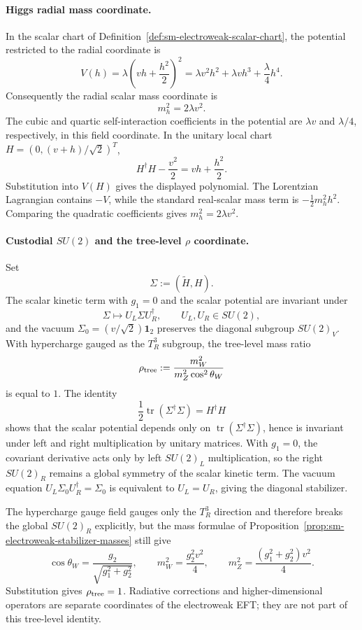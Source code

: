 \paragraph{Higgs radial mass coordinate.}
In the scalar chart of Definition~\ref{def:sm-electroweak-scalar-chart}, the
potential restricted to the radial coordinate is
\[
  V(h)=\lambda\left(vh+\frac{h^2}{2}\right)^2
  =
  \lambda v^2h^2+\lambda vh^3+\frac{\lambda}{4}h^4 .
\]
Consequently the radial scalar mass coordinate is
\[
  m_h^2=2\lambda v^2 .
\]
The cubic and quartic self-interaction coefficients in the potential are
\(\lambda v\) and \(\lambda/4\), respectively, in this field coordinate.
In the unitary local chart \(H=(0,(v+h)/\sqrt2)^T\),
\[
  H^\dagger H-\frac{v^2}{2}=vh+\frac{h^2}{2}.
\]
Substitution into \(V(H)\) gives the displayed polynomial.  The Lorentzian
Lagrangian contains \(-V\), while the standard real-scalar mass term is
\(-\frac12m_h^2h^2\).  Comparing the quadratic coefficients gives
\(m_h^2=2\lambda v^2\).

\paragraph{Custodial \(SU(2)\) and the tree-level \(\rho\) coordinate.}
Set
\[
  \Sigma:=(\widetilde H,H).
\]
The scalar kinetic term with \(g_1=0\) and the scalar potential are invariant
under
\[
  \Sigma\longmapsto U_L\Sigma U_R^\dagger,
  \qquad U_L,U_R\in SU(2),
\]
and the vacuum \(\Sigma_0=(v/\sqrt2)\mathbf1_2\) preserves the diagonal
subgroup \(SU(2)_V\).  With hypercharge gauged as the \(T^3_R\) subgroup, the
tree-level mass ratio
\[
  \rho_{\rm tree}
  :=
  \frac{m_W^2}{m_Z^2\cos^2\theta_W}
\]
is equal to \(1\).
The identity
\[
  \frac{1}{2}\operatorname{tr}(\Sigma^\dagger\Sigma)=H^\dagger H
\]
shows that the scalar potential depends only on
\(\operatorname{tr}(\Sigma^\dagger\Sigma)\), hence is invariant under
left and right multiplication by unitary matrices.  With \(g_1=0\), the
covariant derivative acts only by left \(SU(2)_L\) multiplication, so the
right \(SU(2)_R\) remains a global symmetry of the scalar kinetic term.  The
vacuum equation \(U_L\Sigma_0U_R^\dagger=\Sigma_0\) is equivalent to
\(U_L=U_R\), giving the diagonal stabilizer.

The hypercharge gauge field gauges only the \(T^3_R\) direction and therefore
breaks the global \(SU(2)_R\) explicitly, but the mass formulae of
Proposition~\ref{prop:sm-electroweak-stabilizer-masses} still give
\[
  \cos\theta_W=\frac{g_2}{\sqrt{g_1^2+g_2^2}},\qquad
  m_W^2=\frac{g_2^2v^2}{4},\qquad
  m_Z^2=\frac{(g_1^2+g_2^2)v^2}{4}.
\]
Substitution gives \(\rho_{\rm tree}=1\).  Radiative corrections and
higher-dimensional operators are separate coordinates of the electroweak
EFT; they are not part of this tree-level identity.

